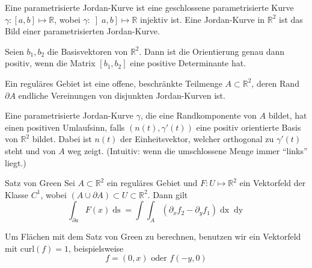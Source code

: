\documentclass[a4paper,10pt]{article}
\def\R{\mathbb{R}}
\begin{document}
Eine parametrisierte Jordan-Kurve ist eine geschlossene parametrisierte Kurve \(\gamma : \left[a,b\right] \mapsto \R\), wobei \(\gamma : \left] a,b \right] \mapsto \R\) injektiv ist. Eine Jordan-Kurve in \(\R^2\) ist das Bild einer parametrisierten Jordan-Kurve.

Seien \(b_1, b_2\) die Basisvektoren von \(\R^2\). Dann ist die Orientierung genau dann positiv, wenn die Matrix \(\left[b_1, b_2\right]\) eine positive Determinante hat.

Ein reguläres Gebiet ist eine offene, beschränkte Teilmenge \(A\subset \R^2\), deren Rand \(\partial A\) endliche Vereinungen von disjunkten Jordan-Kurven ist.

Eine parametrisierte Jordan-Kurve \(\gamma\), die eine Randkomponente von \(A\) bildet, hat einen positiven Umlaufsinn, falls \((n(t), \gamma'(t))\) eine positiv orientierte Basis von \(\R^2\) bildet. Dabei ist \(n(t)\) der Einheitsvektor, welcher orthogonal zu \(\gamma'(t)\) steht und von \(A\) weg zeigt. (Intuitiv: wenn die umschlossene Menge immer ``links'' liegt.)

\begin{mainbox}{Satz von Green}
  Sei \(A \subset \R^2\) ein reguläres Gebiet und \(F: U \mapsto \R^2\) ein Vektorfeld der Klasse \(C^1\), wobei \((A \cup \partial A) \subset U \subset \R^2\). Dann gilt
  \[\int_{\partial a} F(x) \mathop{ds} = \int \int_A \left(\partial_x f_2 - \partial_y f_1\right) \mathop{dx} \mathop{dy}\]
\end{mainbox}
Um Flächen mit dem Satz von Green zu berechnen, benutzen wir ein Vektorfeld mit \(\text{curl}(f) = 1\), beispielsweise \[f = (0,x) \text{ oder } f(-y, 0)\]
\end{document}
